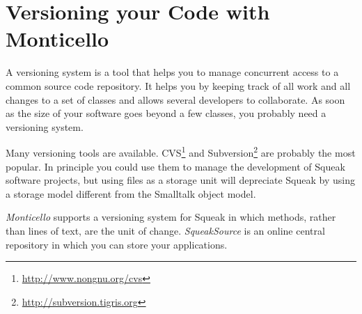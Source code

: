 \documentclass[a4paper,10pt,twoside]{book}
\begin{document}
	\sloppy
\fi

\newcommand{\figlabel}[1]{\label{fig:#1}}
\newcommand{\seclabel}[1]{\label{sec:#1}}

\chapter{Versioning your Code with Monticello}





\noindent

A versioning system is a tool that helps you to manage concurrent access to a common source code repository. It helps you by keeping track of all work and all changes to a set of classes and allows several developers to collaborate. As soon as the size of your software goes beyond a few classes, you probably need a versioning system.

Many versioning tools are available. CVS\footnote{\url{http://www.nongnu.org/cvs}} and Subversion\footnote{\url{http://subversion.tigris.org}} are probably the most popular.
In principle you could use them to manage the development of Squeak software projects, but using files as a storage unit will depreciate Squeak by using a storage model different from the Smalltalk object model.


\emph{Monticello} supports a versioning system for Squeak in which methods, rather than lines of text,
are the unit of change. \emph{SqueakSource} is an online central repository in which you can store your applications.
\end{document}
